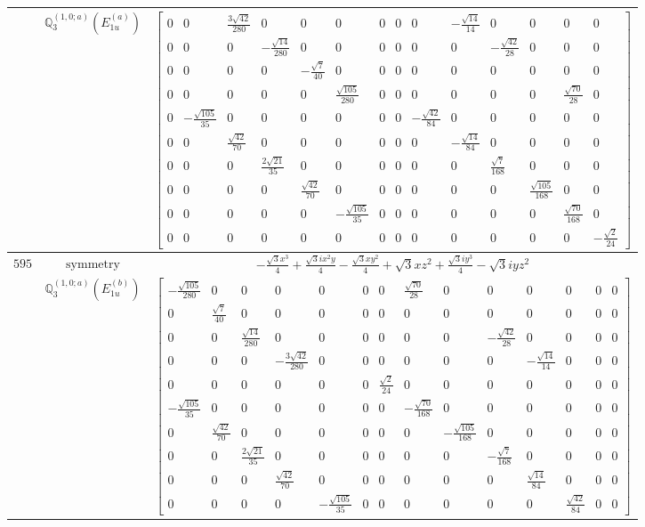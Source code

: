 \documentclass[fleqn,8pt,landscape]{jsarticle}
\begin{document}
\begin{longtable}{ccc}
$  $ & $ \mathbb{Q}_{3}^{(1,0;a)}(E_{1u}^{(a)}) $ & $ \begin{bmatrix} 0 & 0 & \frac{3 \sqrt{42}}{280} & 0 & 0 & 0 & 0 & 0 & 0 & - \frac{\sqrt{14}}{14} & 0 & 0 & 0 & 0 \\ 0 & 0 & 0 & - \frac{\sqrt{14}}{280} & 0 & 0 & 0 & 0 & 0 & 0 & - \frac{\sqrt{42}}{28} & 0 & 0 & 0 \\ 0 & 0 & 0 & 0 & - \frac{\sqrt{7}}{40} & 0 & 0 & 0 & 0 & 0 & 0 & 0 & 0 & 0 \\ 0 & 0 & 0 & 0 & 0 & \frac{\sqrt{105}}{280} & 0 & 0 & 0 & 0 & 0 & 0 & \frac{\sqrt{70}}{28} & 0 \\ 0 & - \frac{\sqrt{105}}{35} & 0 & 0 & 0 & 0 & 0 & 0 & - \frac{\sqrt{42}}{84} & 0 & 0 & 0 & 0 & 0 \\ 0 & 0 & \frac{\sqrt{42}}{70} & 0 & 0 & 0 & 0 & 0 & 0 & - \frac{\sqrt{14}}{84} & 0 & 0 & 0 & 0 \\ 0 & 0 & 0 & \frac{2 \sqrt{21}}{35} & 0 & 0 & 0 & 0 & 0 & 0 & \frac{\sqrt{7}}{168} & 0 & 0 & 0 \\ 0 & 0 & 0 & 0 & \frac{\sqrt{42}}{70} & 0 & 0 & 0 & 0 & 0 & 0 & \frac{\sqrt{105}}{168} & 0 & 0 \\ 0 & 0 & 0 & 0 & 0 & - \frac{\sqrt{105}}{35} & 0 & 0 & 0 & 0 & 0 & 0 & \frac{\sqrt{70}}{168} & 0 \\ 0 & 0 & 0 & 0 & 0 & 0 & 0 & 0 & 0 & 0 & 0 & 0 & 0 & - \frac{\sqrt{2}}{24} \end{bmatrix} $ \\ \hline
$ 595 $ & $ \text{symmetry} $ & $ - \frac{\sqrt{3} x^{3}}{4} + \frac{\sqrt{3} i x^{2} y}{4} - \frac{\sqrt{3} x y^{2}}{4} + \sqrt{3} x z^{2} + \frac{\sqrt{3} i y^{3}}{4} - \sqrt{3} i y z^{2} $ \\
$  $ & $ \mathbb{Q}_{3}^{(1,0;a)}(E_{1u}^{(b)}) $ & $ \begin{bmatrix} - \frac{\sqrt{105}}{280} & 0 & 0 & 0 & 0 & 0 & 0 & \frac{\sqrt{70}}{28} & 0 & 0 & 0 & 0 & 0 & 0 \\ 0 & \frac{\sqrt{7}}{40} & 0 & 0 & 0 & 0 & 0 & 0 & 0 & 0 & 0 & 0 & 0 & 0 \\ 0 & 0 & \frac{\sqrt{14}}{280} & 0 & 0 & 0 & 0 & 0 & 0 & - \frac{\sqrt{42}}{28} & 0 & 0 & 0 & 0 \\ 0 & 0 & 0 & - \frac{3 \sqrt{42}}{280} & 0 & 0 & 0 & 0 & 0 & 0 & - \frac{\sqrt{14}}{14} & 0 & 0 & 0 \\ 0 & 0 & 0 & 0 & 0 & 0 & \frac{\sqrt{2}}{24} & 0 & 0 & 0 & 0 & 0 & 0 & 0 \\ - \frac{\sqrt{105}}{35} & 0 & 0 & 0 & 0 & 0 & 0 & - \frac{\sqrt{70}}{168} & 0 & 0 & 0 & 0 & 0 & 0 \\ 0 & \frac{\sqrt{42}}{70} & 0 & 0 & 0 & 0 & 0 & 0 & - \frac{\sqrt{105}}{168} & 0 & 0 & 0 & 0 & 0 \\ 0 & 0 & \frac{2 \sqrt{21}}{35} & 0 & 0 & 0 & 0 & 0 & 0 & - \frac{\sqrt{7}}{168} & 0 & 0 & 0 & 0 \\ 0 & 0 & 0 & \frac{\sqrt{42}}{70} & 0 & 0 & 0 & 0 & 0 & 0 & \frac{\sqrt{14}}{84} & 0 & 0 & 0 \\ 0 & 0 & 0 & 0 & - \frac{\sqrt{105}}{35} & 0 & 0 & 0 & 0 & 0 & 0 & \frac{\sqrt{42}}{84} & 0 & 0 \end{bmatrix} $ \\ \hline

\end{longtable}
\end{document}
